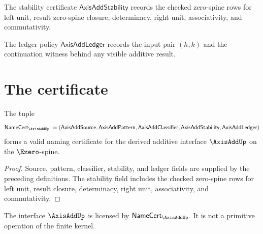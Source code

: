 \begin{definition}
\label{def:axisadd-stability-certificate}
The stability certificate \(\mathsf{AxisAddStability}\) records the checked zero-spine rows for left unit, result zero-spine closure, determinacy, right unit, associativity, and commutativity.
\end{definition}

\begin{definition}
\label{def:axisadd-ledger-policy}
The ledger policy \(\mathsf{AxisAddLedger}\) records the input pair \((h, k)\) and the continuation witness behind any visible additive result.
\end{definition}

\section{The certificate}

\begin{theorem}
\label{thm:concrete-axisadd-namecert}
The tuple
$$
  \mathsf{NameCert}_{\AxisAddUp}
  :=
  (\mathsf{AxisAddSource},
   \mathsf{AxisAddPattern},
   \mathsf{AxisAddClassifier},
   \mathsf{AxisAddStability},
   \mathsf{AxisAddLedger})
$$
forms a valid naming certificate for the derived additive interface \(\AxisAddUp\) on the \(\Ezero\)-spine.
\end{theorem}
\begin{proof}
Source, pattern, classifier, stability, and ledger fields are supplied by the preceding definitions. The stability field includes the checked zero-spine rows for left unit, result closure, determinacy, right unit, associativity, and commutativity.
\end{proof}

\begin{corollary}
\label{cor:axisaddup-licensed-not-primitive}
The interface \(\AxisAddUp\) is licensed by \(\mathsf{NameCert}_{\AxisAddUp}\). It is not a primitive operation of the finite kernel.
\end{corollary}

